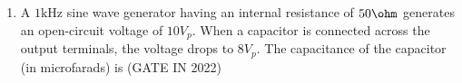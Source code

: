 \begin{enumerate}[label=\thechapter.\arabic*,ref=\thechapter.\theenumi]
\item A $1\text{kHz}$ sine wave generator having an internal resistance of $50 \ohm$  generates an open-circuit voltage of $10 V_p$. When a capacitor is connected across the output terminals, the voltage drops to $8 V_p$. The capacitance of the capacitor (in microfarads) is \hfill(GATE IN 2022)\\ 
\solution

\pagebreak

\end{enumerate}
